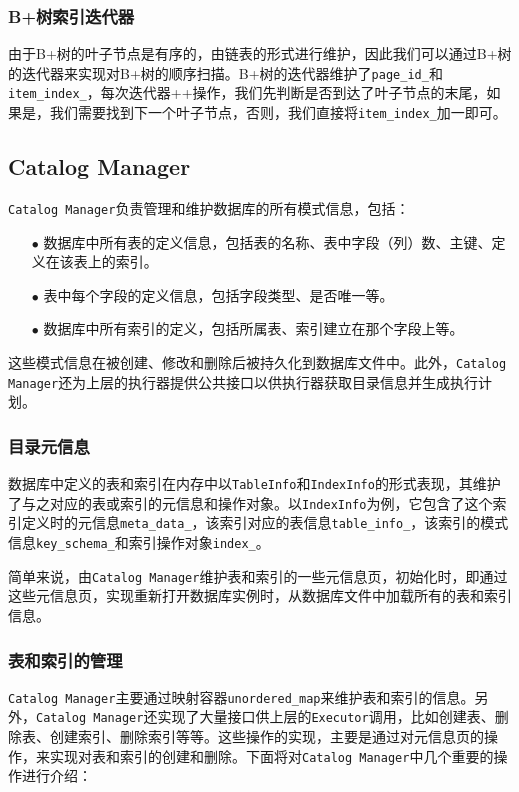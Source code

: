 \documentclass[12pt]{article}
\begin{document}
    \subsubsection{B+树索引迭代器}
    由于B+树的叶子节点是有序的，由链表的形式进行维护，因此我们可以通过B+树的迭代器来实现对B+树的顺序扫描。B+树的迭代器维护了\texttt{page\_id\_}和\texttt{item\_index\_}，每次迭代器++操作，我们先判断是否到达了叶子节点的末尾，如果是，我们需要找到下一个叶子节点，否则，我们直接将\texttt{item\_index\_}加一即可。

    \subsection{Catalog Manager}
    \texttt{Catalog Manager}负责管理和维护数据库的所有模式信息，包括：
    \begin{itemize}
        \item[$\bullet$] 数据库中所有表的定义信息，包括表的名称、表中字段（列）数、主键、定义在该表上的索引。
        \item[$\bullet$] 表中每个字段的定义信息，包括字段类型、是否唯一等。
        \item[$\bullet$] 数据库中所有索引的定义，包括所属表、索引建立在那个字段上等。
    \end{itemize}

    这些模式信息在被创建、修改和删除后被持久化到数据库文件中。此外，\texttt{Catalog Manager}还为上层的执行器提供公共接口以供执行器获取目录信息并生成执行计划。
    
    \subsubsection{目录元信息}
    数据库中定义的表和索引在内存中以\texttt{TableInfo}和\texttt{IndexInfo}的形式表现，其维护了与之对应的表或索引的元信息和操作对象。以\texttt{IndexInfo}为例，它包含了这个索引定义时的元信息\texttt{meta\_data\_}，该索引对应的表信息\texttt{table\_info\_}，该索引的模式信息\texttt{key\_schema\_}和索引操作对象\texttt{index\_}。

    简单来说，由\texttt{Catalog Manager}维护表和索引的一些元信息页，初始化时，即通过这些元信息页，实现重新打开数据库实例时，从数据库文件中加载所有的表和索引信息。

    \subsubsection{表和索引的管理}
    \texttt{Catalog Manager}主要通过映射容器\texttt{unordered\_map}来维护表和索引的信息。另外，\texttt{Catalog Manager}还实现了大量接口供上层的\texttt{Executor}调用，比如创建表、删除表、创建索引、删除索引等等。这些操作的实现，主要是通过对元信息页的操作，来实现对表和索引的创建和删除。下面将对\texttt{Catalog Manager}中几个重要的操作进行介绍：
\end{document}
